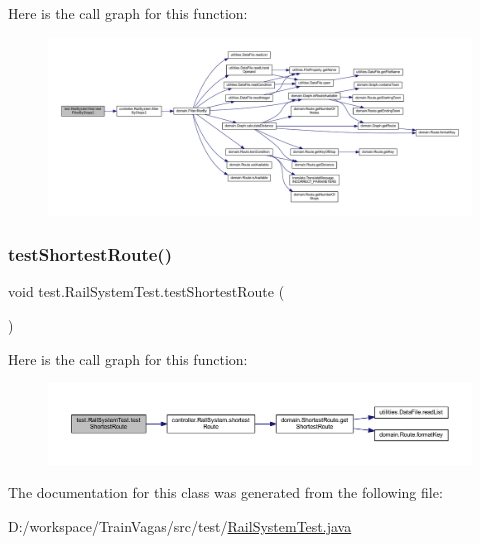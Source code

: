 Here is the call graph for this function\+:\nopagebreak
\begin{figure}[H]
\begin{center}
\leavevmode
\includegraphics[width=350pt]{classtest_1_1_rail_system_test_a2a1e9411ccf36a39296c00a201f17f37_cgraph}
\end{center}
\end{figure}
\mbox{\label{classtest_1_1_rail_system_test_a01b95869ac2414fa487a6540436d7563}} 
\subsubsection{\texorpdfstring{test\+Shortest\+Route()}{testShortestRoute()}}
{\footnotesize\ttfamily void test.\+Rail\+System\+Test.\+test\+Shortest\+Route (\begin{DoxyParamCaption}{ }\end{DoxyParamCaption})}

Here is the call graph for this function\+:\nopagebreak
\begin{figure}[H]
\begin{center}
\leavevmode
\includegraphics[width=350pt]{classtest_1_1_rail_system_test_a01b95869ac2414fa487a6540436d7563_cgraph}
\end{center}
\end{figure}


The documentation for this class was generated from the following file\+:\begin{DoxyCompactItemize}
\item 
D\+:/workspace/\+Train\+Vagas/src/test/\hyperlink{_rail_system_test_8java}{Rail\+System\+Test.\+java}\end{DoxyCompactItemize}
